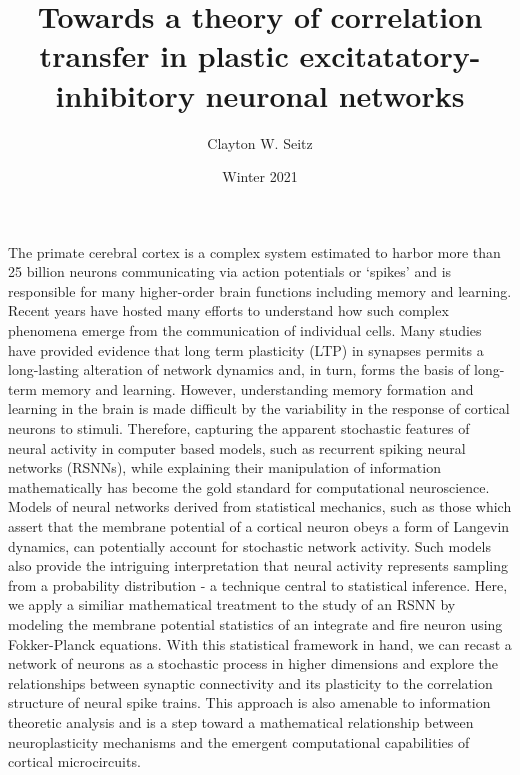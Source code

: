 \documentclass{ucetd}
\title{Towards a theory of correlation transfer in plastic excitatatory-inhibitory neuronal networks}
\author{Clayton W. Seitz}
\date{Winter 2021}
\begin{document}
\maketitle

\makecopyright
\makeepigraph


\tableofcontents

\acknowledgments

\abstract

The primate cerebral cortex is a complex system estimated to harbor more than 25 billion neurons communicating via action potentials or `spikes' and is responsible for many higher-order brain functions including memory and learning. Recent years have hosted many efforts to understand how such complex phenomena emerge from the communication of individual cells. Many studies have provided evidence that long term plasticity (LTP) in synapses permits a long-lasting alteration of network dynamics and, in turn, forms the basis of long-term memory and learning. However, understanding memory formation and learning in the brain is made difficult by the variability in the response of cortical neurons to stimuli. Therefore, capturing the apparent stochastic features of neural activity in computer based models, such as recurrent spiking neural networks (RSNNs), while explaining their manipulation of information mathematically has become the gold standard for computational neuroscience. Models of neural networks derived from statistical mechanics, such as those which assert that the membrane potential of a cortical neuron obeys a form of Langevin dynamics, can potentially account for stochastic network activity. Such models also provide the intriguing interpretation that neural activity represents sampling from a probability distribution - a technique central to statistical inference.  Here, we apply a similiar mathematical treatment to the study of an RSNN by modeling the membrane potential statistics of an integrate and fire neuron using Fokker-Planck equations. With this statistical framework in hand, we can recast a network of neurons as a stochastic process in higher dimensions and explore the relationships between synaptic connectivity and its plasticity to the correlation structure of neural spike trains. This approach is also amenable to information theoretic analysis and is a step toward a mathematical relationship between neuroplasticity mechanisms and the emergent computational capabilities of cortical microcircuits.
\end{document}
